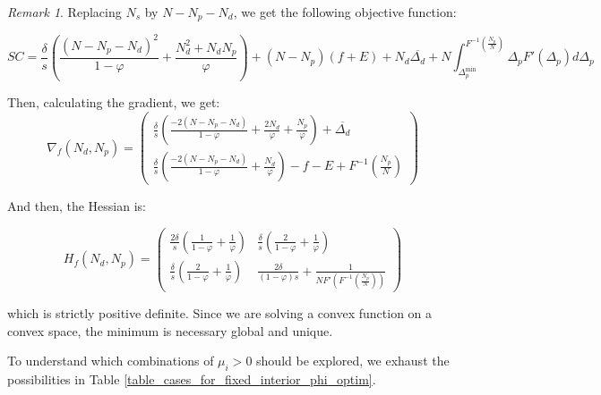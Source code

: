 \documentclass[english, a4paper]{article}
\theoremstyle{plain}
\theoremstyle{definition}
\theoremstyle{remark}
\newtheorem{remark}{Remark}
\begin{document}
\begin{remark}
    Replacing $N_s$ by $N - N_p - N_d$, we get the following objective function:

    \begin{equation*}
        SC = \frac{\delta}{s}\left( \frac{(N - N_p - N_d)^2}{1-\varphi} + \frac{N_d^2 + N_d N_p}{\varphi}\right) + (N - N_p)(f+E) + N_d \overline{\Delta_d} + N \int_{\Delta_p^{\text{min}}}^{F^{-1}\left( \frac{N_p}{N} \right)} \Delta_p F'(\Delta_p) d \Delta_p
    \end{equation*}

    Then, calculating the gradient, we get:
    \begin{equation*}
    \nabla_f (N_d, N_p) = 
    \begin{pmatrix}
        \frac{\delta}{s} \left( \frac{-2(N-N_p-N_d)}{1-\varphi} + \frac{2N_d}{\varphi} + \frac{N_p}{\varphi} \right) + \overline{\Delta_d}\\
        \frac{\delta}{s} \left( \frac{-2(N-N_p-N_d)}{1-\varphi} + \frac{N_d}{\varphi} \right) -f-E + F^{-1}\left( \frac{N_p}{N} \right)
    \end{pmatrix}
    \end{equation*}

    And then, the Hessian is:

    \begin{equation*}
        H_f(N_d, N_p) =
        \begin{pmatrix}
            \frac{2\delta}{s}\left(\frac{1}{1-\varphi} + \frac{1}{\varphi}\right) &
            \frac{\delta}{s}\left(\frac{2}{1-\varphi} + \frac{1}{\varphi}\right)\\
            \frac{\delta}{s}\left(\frac{2}{1-\varphi} + \frac{1}{\varphi}\right) &
            \frac{2\delta}{(1-\varphi )s} + \frac{1}{NF'\left(F^{-1}\left( \frac{N_p}{N} \right)\right)}
        \end{pmatrix}
    \end{equation*}

    which is strictly positive definite. Since we are solving a convex function on a convex space, the minimum is necessary global and unique.
\end{remark}

To understand which combinations of $\mu_i > 0$ should be explored, we exhaust the possibilities in Table \ref{table_cases_for_fixed_interior_phi_optim}.
\end{document}
